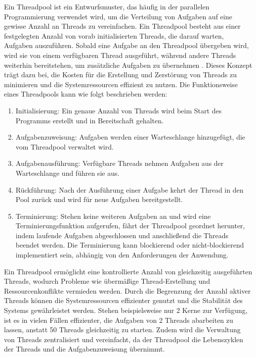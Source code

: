 Ein Threadpool ist ein Entwurfsmuster, das häufig in der parallelen Programmierung verwendet wird, um die Verteilung von Aufgaben auf eine gewisse Anzahl an Threads zu vereinfachen. Ein Threadpool besteht aus einer festgelegten Anzahl von vorab initialisierten Threads, die darauf warten, Aufgaben auszuführen. Sobald eine Aufgabe an den Threadpool übergeben wird, wird sie von einem verfügbaren Thread ausgeführt, während andere Threads weiterhin bereitstehen, um zusätzliche Aufgaben zu übernehmen \citep{ThreadPool_Tutorial_Cpp}. Dieses Konzept trägt dazu bei, die Kosten für die Erstellung und Zerstörung von Threads zu minimieren und die Systemressourcen effizient zu nutzen. Die Funktionsweise eines Threadpools kann wie folgt beschrieben werden:
\begin{enumerate}
    \item Initialisierung: Ein genaue Anzahl von Threads wird beim Start des Programms erstellt und in Bereitschaft gehalten.
    \item Aufgabenzuweisung: Aufgaben werden einer Warteschlange hinzugefügt, die vom Threadpool verwaltet wird.
    \item Aufgabenausführung: Verfügbare Threads nehmen Aufgaben aus der Warteschlange und führen sie aus.
    \item Rückführung: Nach der Ausführung einer Aufgabe kehrt der Thread in den Pool zurück und wird für neue Aufgaben bereitgestellt.
    \item Terminierung: Stehen keine weiteren Aufgaben an und wird eine Terminierungsfunktion aufgerufen, fährt der Threadpool geordnet herunter, indem laufende Aufgaben abgeschlossen und anschließend die Threads beendet werden. Die Terminierung kann blockierend oder nicht-blockierend implementiert sein, abhängig von den Anforderungen der Anwendung.
\end{enumerate}

Ein Threadpool ermöglicht eine kontrollierte Anzahl von gleichzeitig ausgeführten Threads, wodurch Probleme wie übermäßige Thread-Erstellung und Ressourcenkonflikte vermieden werden. Durch die Begrenzung der Anzahl aktiver Threads können die Systemressourcen effizienter genutzt und die Stabilität des Systems gewährleistet werden. Stehen beispielsweise nur 2 Kerne zur Verfügung, ist es in vielen Fällen effizienter, die Aufgaben von 2 Threads abarbeiten zu lassen, anstatt 50 Threads gleichzeitig zu starten. Zudem wird die Verwaltung von Threads zentralisiert und vereinfacht, da der Threadpool die Lebenszyklen der Threads und die Aufgabenzuweisung übernimmt.

